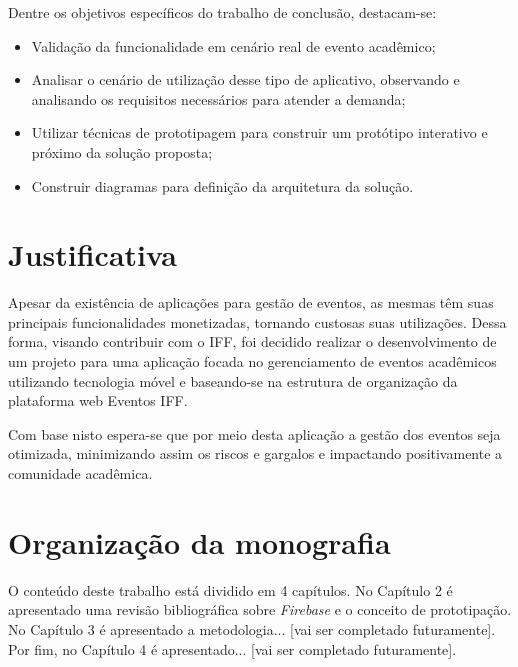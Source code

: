 Dentre os objetivos específicos do trabalho de conclusão, destacam-se:
\begin{itemize}
    \item Validação da funcionalidade em cenário real de evento acadêmico;
    \item Analisar o cenário de utilização desse tipo de aplicativo, observando e analisando os requisitos necessários para atender a demanda;
    \item Utilizar técnicas de prototipagem para construir um protótipo interativo e próximo da solução proposta;
    \item Construir diagramas para definição da arquitetura da solução. 
\end{itemize}

\section{Justificativa}

Apesar da existência de aplicações para gestão de eventos, as mesmas têm suas principais funcionalidades monetizadas, tornando custosas suas utilizações. Dessa forma, visando contribuir com o IFF, foi decidido realizar o desenvolvimento de um projeto para uma aplicação focada no gerenciamento de eventos acadêmicos utilizando tecnologia móvel e baseando-se na estrutura de organização da plataforma web Eventos IFF.

Com base nisto espera-se que por meio desta aplicação a gestão dos eventos seja otimizada, minimizando assim os riscos e gargalos e impactando positivamente a comunidade acadêmica.

\section{Organização da monografia}

O conteúdo deste trabalho está dividido em 4 capítulos. No Capítulo 2 é apresentado  uma revisão bibliográfica sobre \textit{Firebase} e o conceito de prototipação. No Capítulo 3 é apresentado a metodologia... [vai ser completado futuramente]. Por fim, no Capítulo 4 é apresentado... [vai ser completado futuramente].
